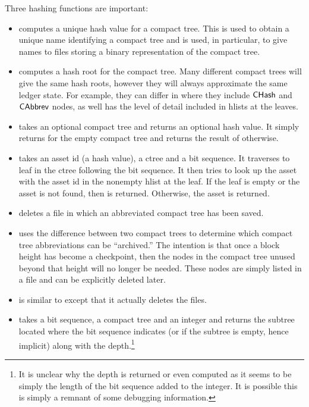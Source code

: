 Three hashing functions are important:
\begin{itemize}
\item {} computes a unique hash value for a compact tree.
This is used to obtain a unique name identifying a compact tree
and is used, in particular, to give names to files storing a binary
representation of the compact tree.
\item {} computes a hash root for the compact tree.
Many different compact trees will give the same hash roots, however they will
always approximate the same ledger state.
For example, they can differ in where they include ${\constr{CHash}}$
and ${\constr{CAbbrev}}$ nodes, as well has the level of detail included in
hlists at the leaves.
\item {} takes an optional compact tree and returns an optional hash value.
It simply returns {} for the empty compact tree {}
and returns the result of {} otherwise.
\item {} takes an asset id (a hash value), a ctree and a bit sequence.
It traverses to leaf in the ctree following the bit sequence.
It then tries to look up the asset with the asset id in the nonempty hlist at the leaf.
If the leaf is empty or the asset is not found, then {} is returned. Otherwise, the asset is returned.
\item {} deletes a file in which an abbreviated compact tree has been saved.
\item {} uses the difference between two compact trees to determine which compact tree abbreviations can be ``archived.'' The intention is that once a block height has become a checkpoint,
then the nodes in the compact tree unused beyond that height will no longer be needed.
These nodes are simply listed in a file {} and can be explicitly deleted later.
\item {} is similar to {} except that
it actually deletes the files.
\item {} takes a bit sequence, a compact tree and an integer
and returns the subtree located where the bit sequence indicates (or {} if
the subtree is empty, hence implicit) along with the depth.\footnote{It is unclear why the depth is returned or even computed as it seems to be simply the length of the bit sequence added to the integer. It is possible this is simply a remnant of some debugging information.}

\end{itemize}
